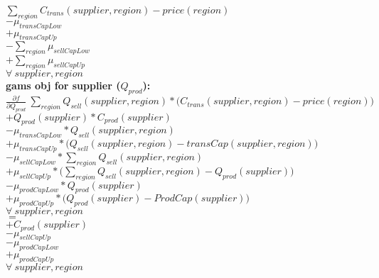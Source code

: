 \documentclass{article}
\begin{document}
\quad$\sum_{region} C_{trans}(supplier,region) - price(region)$\\
\quad$-\mu_{transCapLow}$\\
\quad$+\mu_{transCapUp} $\\
\quad$-\sum_{region}\mu_{sellCapLow} $\\
\quad$+\sum_{region}\mu_{sellCapUp}$\\
\quad$\forall \:supplier,region$\\

\textbf{gams obj for supplier ($Q_{prod}$):}\\
\quad$\frac{\partial f}{\partial Q_{prod}} \:\sum_{region} Q_{sell}(supplier, region) *\Big(C_{trans}(supplier,region) - price(region)\Big)$\\
\quad$+ Q_{prod}(supplier)*C_{prod}(supplier)$\\
\quad$-\mu_{transCapLow} * Q_{sell}(supplier, region)$\\
\quad$+\mu_{transCapUp} *\Big( Q_{sell}(supplier, region) - transCap(supplier, region)\Big)$\\
\quad$-\mu_{sellCapLow} * \sum_{region} Q_{sell}(supplier, region)$\\
\quad$+\mu_{sellCapUp}*\Big(\sum_{region} Q_{sell}(supplier, region) -  Q_{prod}(supplier) \Big) $\\
\quad$-\mu_{prodCapLow} * Q_{prod}(supplier)$\\
\quad$+\mu_{prodCapUp}*\Big(Q_{prod}(supplier) - ProdCap(supplier)\Big)$\\
\quad$\forall \:supplier,region$\\
\quad$=$\\
\quad$+C_{prod}(supplier)$\\
\quad$-\mu_{sellCapUp}$\\
\quad$-\mu_{prodCapLow}$\\
\quad$+\mu_{prodCapUp}$\\
\quad$\forall \:supplier,region$\\
\end{document}
